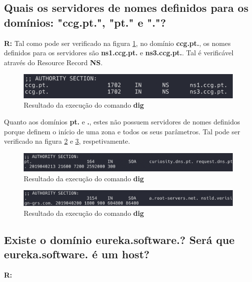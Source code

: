 \documentclass{llncs}
\begin{document}
\subsection{\textbf{Quais os servidores de nomes definidos para os domínios: "ccg.pt.", "pt." e "."?}}
\textbf{R:} Tal como pode ser verificado na figura \ref{fig:1c1}, no domínio \textbf{ccg.pt.}, os nomes definidos para os servidores são \textbf{ns1.ccg.pt.} e \textbf{ns3.ccg.pt.}. Tal é verificável através do Resource Record \textbf{NS}.

\begin{figure}[H]
\begin{center}
\includegraphics[scale=0.4]{1c1.png}
\end{center}
\caption{\label{fig:1c1}Resultado da execução do comando \textbf{dig}}
\end{figure}

Quanto aos domínios \textbf{pt.} e \textbf{.}, estes não possuem servidores de nomes definidos porque definem o início de uma zona e todos os seus parâmetros. Tal pode ser verificado na figura \ref{fig:1c2} e \ref{fig:1c3}, respetivamente.

\begin{figure}[H]
\begin{center}
\includegraphics[scale=0.4]{1c2.png}
\end{center}
\caption{\label{fig:1c2}Resultado da execução do comando \textbf{dig}}
\end{figure}

\begin{figure}[H]
\begin{center}
\includegraphics[scale=0.4]{1c3.png}
\end{center}
\caption{\label{fig:1c3}Resultado da execução do comando \textbf{dig}}
\end{figure}


\subsection{\textbf{Existe o domínio eureka.software.? Será que eureka.software. é um host?}}
\textbf{R:}
\end{document}
